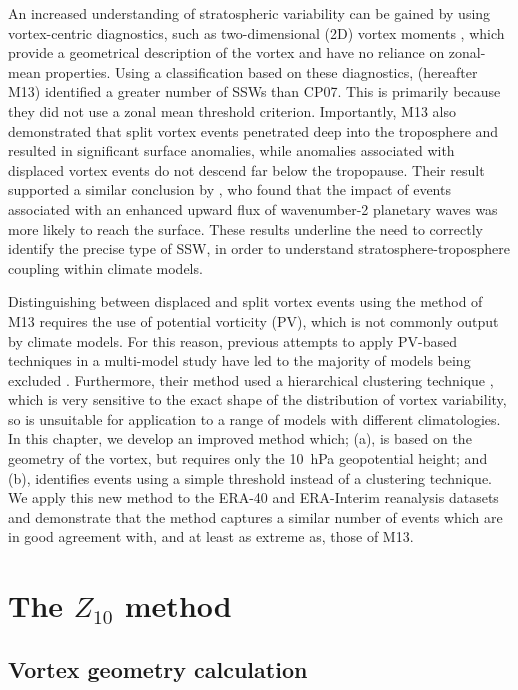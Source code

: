 An increased understanding of stratospheric variability can be gained by using
vortex-centric diagnostics, such as two-dimensional (2D) vortex moments
\citep{Waugh1997, Waugh1999, Mitchell2011, Mitchell2011a}, which provide a
geometrical description of the vortex and have no reliance on zonal-mean
properties. Using a classification based on these diagnostics,
\citet{Mitchell2013} (hereafter M13) identified a greater number of SSWs than
CP07. This is primarily because they did not use a zonal mean threshold
criterion. Importantly, M13 also demonstrated that split vortex events
penetrated deep into the troposphere and resulted in significant surface
anomalies, while anomalies associated with displaced vortex events do not
descend far below the tropopause. Their result supported a similar conclusion by
\citet{Nakagawa2006}, who found that the impact of events associated with an
enhanced upward flux of wavenumber-2 planetary waves was more likely to reach
the surface. These results underline the need to correctly identify the precise
type of SSW, in order to understand stratosphere-troposphere coupling within
climate models.

Distinguishing between displaced and split vortex events using the method of M13
requires the use of potential vorticity (PV), which is not commonly output by
climate models. For this reason, previous attempts to apply PV-based techniques
in a multi-model study have led to the majority of models being excluded
\citep{Mitchell2012a}. Furthermore, their method used a hierarchical clustering
technique \citep{Hannachi2010}, which is very sensitive to the exact shape of
the distribution of vortex variability, so is unsuitable for application to a
range of models with different climatologies. In this chapter, we develop an
improved method which; (a), is based on the geometry of the vortex, but requires
only the 10~hPa geopotential height; and (b), identifies events using a simple
threshold instead of a clustering technique. We apply this new method to the
ERA-40 and ERA-Interim reanalysis datasets and demonstrate that the method
captures a similar number of events which are in good agreement with, and at
least as extreme as, those of M13.


\section{The $Z_{10}$ method}
\subsection{Vortex geometry calculation}

